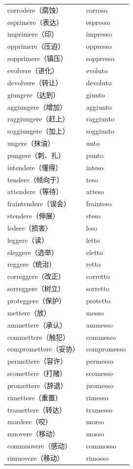 \documentclass[UTF8,a4paper,titlepage,10pt]{report}
\begin{document}
\begin{enumerate}
\begin{itemize}
\begin{center}
\begin{tabular}{ll}
corrodere（腐蚀） & corroso\\
esprimere（表达） & espresso\\
imprimere（印） & impresso\\
opprimere（压迫） & oppresso\\
sopprimere（镇压） & soppresso\\
evolvere（进化） & evoluto\\
devolvere（转让） & devoluto\\
giungere（达到） & giunto\\
aggiungere（增加） & aggiunto\\
raggiungere（赶上） & raggiunto\\
soggiungere（加上） & soggiunto\\
ungere（抹油） & unto\\
pungere（刺、扎） & punto\\
intendere（懂得） & inteso\\
tendere（倾向于） & teso\\
attendere（等待） & atteso\\
fraintendere（误会） & frainteso\\
stendere（伸展） & steso\\
ledere（损害） & leso\\
leggere（读） & letto\\
eleggere（选举） & eletto\\
reggere（统治） & retto\\
correggere（改正） & corretto\\
sorreggere（树立） & sorretto\\
proteggere（保护） & protetto\\
mettere（放） & messo\\
ammettere（承认） & ammesso\\
commettere（触犯） & commesso\\
compromettere（妥协） & compromesso\\
permettere（容许） & permesso\\
scomettere（打赌） & scomesso\\
promettere（辞退） & promesso\\
rimettere（重置） & rimesso\\
tramettere（转达） & tramesso\\
mordere（咬） & morso\\
muovere（移动） & mosso\\
commuovere（感动） & commosso\\
rimuovere（移动） & rimosso\\

\end{tabular}
\end{center}
\end{itemize}
\end{enumerate}
\end{document}
